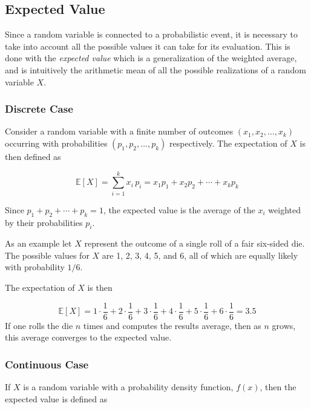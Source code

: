 \subsection{Expected Value}\label{sec:expected-value}

Since a random variable is connected to a probabilistic event, it is necessary to take into account all the possible values it can take for its evaluation. This is done with the \emph{expected value}
which is a generalization of the weighted average, and is intuitively the arithmetic mean of all the possible realizations of a random variable \(X\).

\subsubsection{Discrete Case}
Consider a random variable with a finite number of outcomes $(x_{1},x_{2},\ldots ,x_{k})$ occurring with probabilities $(p_{1},p_{2},\ldots ,p_{k})$ respectively. The expectation of $X$ is then defined as

\begin{equation}
	\mathbb{E}[X]=\sum _{i=1}^{k}x_{i}\,p_{i}=x_{1}p_{1}+x_{2}p_{2}+\cdots +x_{k}p_{k}
\end{equation}

Since $p_{1}+p_{2}+\cdots +p_{k}=1$, the expected value is the average of the $x_{i}$ weighted by their probabilities $p_{i}$.


As an example let $X$ represent the outcome of a single roll of a fair six-sided die. The possible values for $X$ are 1, 2, 3, 4, 5, and 6, all of which are equally likely with probability $1/6$.

The expectation of $X$ is then

\begin{equation*}
	\mathbb{E}[X]=1\cdot {\frac {1}{6}}+2\cdot {\frac {1}{6}}+3\cdot {\frac {1}{6}}+4\cdot {\frac {1}{6}}+5\cdot {\frac {1}{6}}+6\cdot {\frac {1}{6}}=3.5
\end{equation*}
If one rolls the die $n$ times and computes the results average, then as $n$ grows, this average converges to the expected value.

\subsubsection{Continuous Case}
If $X$ is a random variable with a probability density function, $f(x)$, then the expected value is defined as

